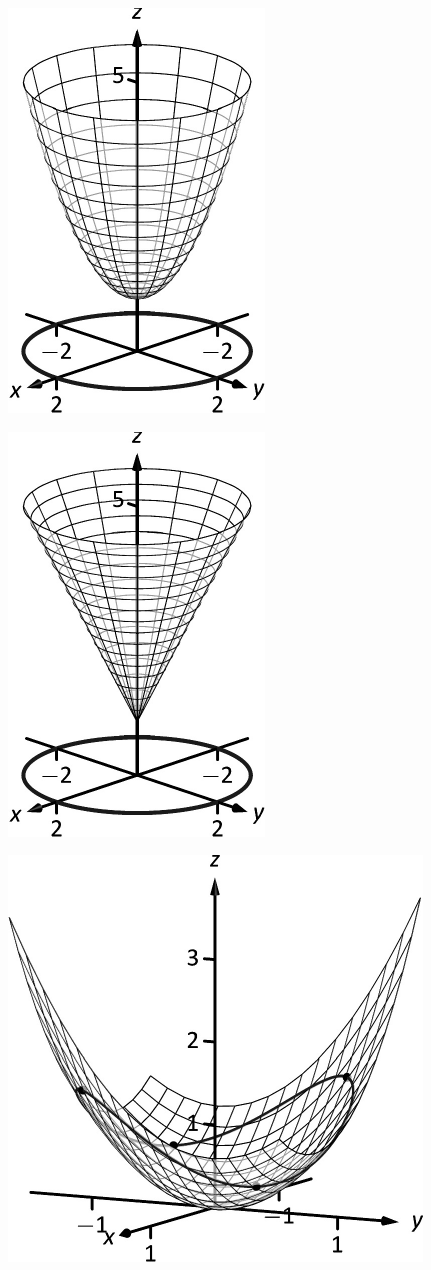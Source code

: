 \documentclass[10pt]{article}
\begin{document}
\includegraphics{figmass3a_3DBW.pdf}
\texttt{}

\includegraphics{figmass3b_3DBW.pdf}
\texttt{}

\includegraphics{figmchain2_3DBW.pdf}
\texttt{}
\end{document}
